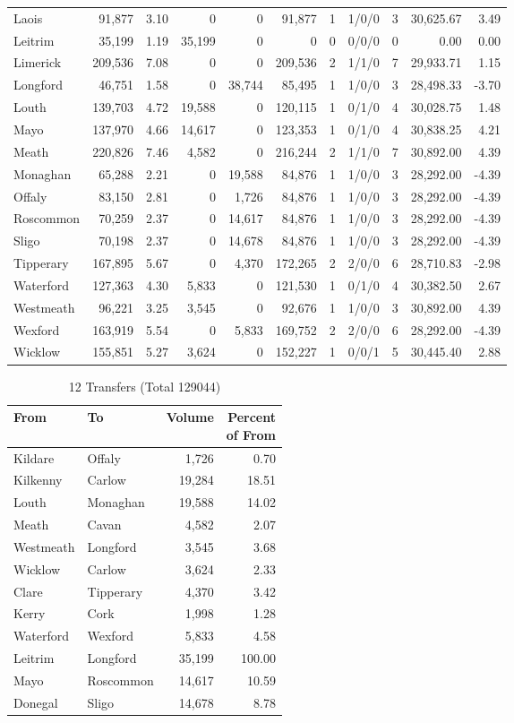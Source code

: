\documentclass[a4paper]{article}
\begin{document}
\begin{longtable}{lrrrrrrlrrr}
Laois&91,877& 3.10&0&0&91,877&1&1/0/0&3&30,625.67& 3.49\\ 
Leitrim&35,199& 1.19&35,199&0&0&0&0/0/0&0& 0.00& 0.00\\ 
Limerick&209,536& 7.08&0&0&209,536&2&1/1/0&7&29,933.71& 1.15\\ 
Longford&46,751& 1.58&0&38,744&85,495&1&1/0/0&3&28,498.33&-3.70\\ 
Louth&139,703& 4.72&19,588&0&120,115&1&0/1/0&4&30,028.75& 1.48\\ 
Mayo&137,970& 4.66&14,617&0&123,353&1&0/1/0&4&30,838.25& 4.21\\ 
Meath&220,826& 7.46&4,582&0&216,244&2&1/1/0&7&30,892.00& 4.39\\ 
Monaghan&65,288& 2.21&0&19,588&84,876&1&1/0/0&3&28,292.00&-4.39\\ 
Offaly&83,150& 2.81&0&1,726&84,876&1&1/0/0&3&28,292.00&-4.39\\ 
Roscommon&70,259& 2.37&0&14,617&84,876&1&1/0/0&3&28,292.00&-4.39\\ 
Sligo&70,198& 2.37&0&14,678&84,876&1&1/0/0&3&28,292.00&-4.39\\ 
Tipperary&167,895& 5.67&0&4,370&172,265&2&2/0/0&6&28,710.83&-2.98\\ 
Waterford&127,363& 4.30&5,833&0&121,530&1&0/1/0&4&30,382.50& 2.67\\ 
Westmeath&96,221& 3.25&3,545&0&92,676&1&1/0/0&3&30,892.00& 4.39\\ 
Wexford&163,919& 5.54&0&5,833&169,752&2&2/0/0&6&28,292.00&-4.39\\ 
Wicklow&155,851& 5.27&3,624&0&152,227&1&0/0/1&5&30,445.40& 2.88\\ 
\end{longtable}

\begin{table}[htbp]
\caption{12 Transfers (Total 129044)}
\centering
\begin{tabular}{llrr} \toprule
From &To &Volume &\shortstack{Percent\\of From} \\ \midrule
Kildare&Offaly&1,726& 0.70\\ 
Kilkenny&Carlow&19,284&18.51\\ 
Louth&Monaghan&19,588&14.02\\ 
Meath&Cavan&4,582& 2.07\\ 
Westmeath&Longford&3,545& 3.68\\ 
Wicklow&Carlow&3,624& 2.33\\ 
Clare&Tipperary&4,370& 3.42\\ 
Kerry&Cork&1,998& 1.28\\ 
Waterford&Wexford&5,833& 4.58\\ 
Leitrim&Longford&35,199&100.00\\ 
Mayo&Roscommon&14,617&10.59\\ 
Donegal&Sligo&14,678& 8.78\\ 
\bottomrule
\end{tabular}
\end{table}
\end{document}

